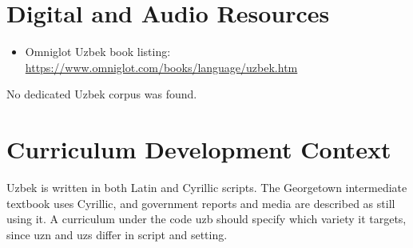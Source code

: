 \documentclass[12pt]{article}
\begin{document}
\section{Digital and Audio Resources}
\begin{itemize}
\item Omniglot Uzbek book listing: \url{https://www.omniglot.com/books/language/uzbek.htm}
\end{itemize}
No dedicated Uzbek corpus was found.

\section{Curriculum Development Context}
Uzbek is written in both Latin and Cyrillic scripts. The Georgetown intermediate textbook uses Cyrillic, and government reports and media are described as still using it. A curriculum under the code uzb should specify which variety it targets, since uzn and uzs differ in script and setting.
\end{document}
